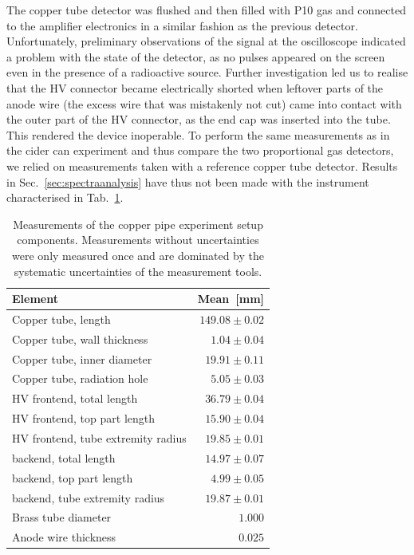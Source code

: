 The copper tube detector was flushed and then filled with P10 gas and connected to the amplifier electronics in a similar fashion as the previous detector. Unfortunately, preliminary observations of the signal at the oscilloscope indicated a problem with the state of the detector, as no pulses appeared on the screen even in the presence of a radioactive source. Further investigation led us to realise that the HV connector became electrically shorted when leftover parts of the anode wire (the excess wire that was mistakenly not cut) came into contact with the outer part of the HV connector, as the end cap was inserted into the tube. This rendered the device inoperable. To perform the same measurements as in the cider can experiment and thus compare the two proportional gas detectors, we relied on measurements taken with a reference copper tube detector.
Results in Sec.~\ref{sec:spectraanalysis} have thus not been made with the instrument characterised in Tab.~\ref{Tab:coppercan_sizes}.

\begin{table}[htb]
	\begin{tabularx}{\linewidth}{p{4.5cm}r}
		\textbf{Element} & \textbf{Mean}~{[}mm{]}          \\ \hline
		Copper tube, length                & $149.08 \pm 0.02$ \\
		Copper tube, wall thickness        & $1.04 \pm 0.04$   \\
		Copper tube, inner diameter        & $19.91 \pm 0.11$  \\
		Copper tube, radiation hole        & $5.05 \pm 0.03$   \\
		HV frontend, total length          & $36.79 \pm 0.04$  \\
		HV frontend, top part length       & $15.90 \pm 0.04$  \\
		HV frontend, tube extremity radius & $19.85 \pm 0.01$  \\
		backend, total length              & $14.97 \pm 0.07$  \\
		backend, top part length           & $4.99 \pm 0.05$   \\
		backend, tube extremity radius     & $19.87 \pm 0.01$  \\
		Brass tube diameter                & $1.000$           \\
		Anode wire thickness               & $0.025$           \\ \hline
	\end{tabularx}
\caption{Measurements of the copper pipe experiment setup components. Measurements without uncertainties were only measured once and are dominated by the systematic uncertainties of the measurement tools.}%
\label{Tab:coppercan_sizes}
\end{table}

